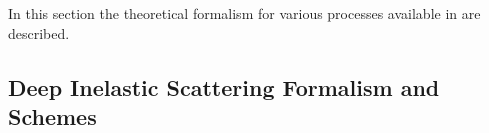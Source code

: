 
\def\kt{\ensuremath{k_t}}
\newcommand{\Pmax}{p}
\newcommand{\CCFM}{CCFMa,CCFMb,Catani:1989sg,CCFMd}


%
In this section the theoretical formalism for various processes available in \fitter are described.



\subsection{Deep Inelastic Scattering Formalism and Schemes}
\label{dissection}


